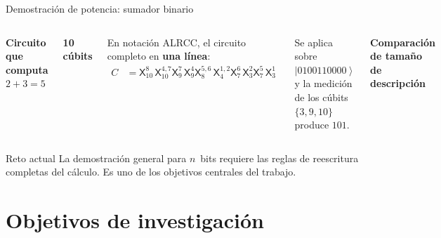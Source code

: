 \documentclass[12pt, aspectratio=169]{beamer}
\newcommand{\qg}[1]{\mathsf{#1}}
\newcommand{\stategate}[3]{\qg{#1}^{#2}_{#3}}
\newcommand{\ket}[1]{\left|#1\right\rangle}
\begin{document}
\begin{frame}{Demostración de potencia: sumador binario}
  \begin{columns}[T]
    \textbf{Circuito que computa $2 + 3 = 5$}

    \textbf{10 cúbits}

    \medskip
    En notación ALRCC, el circuito completo en \textbf{una línea}:
    \begin{align*}
      C & = \stategate{X}{8}{10}\,\stategate{X}{4,7}{10}
      \stategate{X}{7}{9}\,\stategate{X}{4}{9}
      \stategate{X}{5,6}{8}\,\stategate{X}{1,2}{4}
      \stategate{X}{6}{7}\,\stategate{X}{2}{3}
      \stategate{X}{5}{7}\,\stategate{X}{1}{3}
    \end{align*}

    Se aplica sobre $\ket{0100110000}$ y la medición de los
    cúbits $\{3,9,10\}$ produce $101$.

    \textbf{Comparación de tamaño de descripción}

  \end{columns}
  \begin{alertblock}{Reto actual}
    \small
    La demostración general para $n$~bits requiere las
    reglas de reescritura completas del cálculo.
    Es uno de los objetivos centrales del trabajo.
  \end{alertblock}
\end{frame}

\section{Objetivos de investigación}
\end{document}
